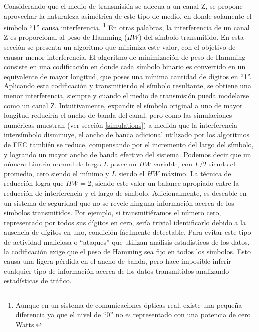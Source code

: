 Considerando que el medio de transmisión se adecua a un canal Z, se propone aprovechar la naturaleza asimétrica de este tipo de medio, en donde solamente el símbolo ``1'' causa interferencia. \footnote{Aunque en un sistema de comunicaciones ópticas real, existe una pequeña diferencia ya que el nivel de ``0'' no es representado con una potencia de cero Watts.}
En otras palabras, la interferencia de un canal Z es proporcional al peso de Hamming ($HW$) del símbolo transmitido.
En esta sección se presenta un algoritmo que minimiza este valor, con el objetivo de causar menor interferencia. El algoritmo de minimización de peso de Hamming consiste en una codificación en donde cada símbolo binario es convertido en un equivalente de mayor longitud, que posee una mínima cantidad de dígitos en ``1''. Aplicando esta codificación y transmitiendo el símbolo resultante, se obtiene una menor interferencia, siempre y cuando el medio de transmisión pueda modelarse como un canal Z.
Intuitivamente, expandir el símbolo original a uno de mayor longitud reduciría el ancho de banda del canal; pero como las simulaciones numéricas muestran (ver sección \ref{simulations}) a medida que la interferencia intersímbolo disminuye, el ancho de banda adicional utilizado por los algoritmos de FEC también se reduce, compensando por el incremento del largo del símbolo, y logrando un mayor ancho de banda efectivo del sistema.
Podemos decir que un número binario normal de largo $L$ posee un $HW$ variable, con $L/2$ siendo el promedio, cero siendo el mínimo y $L$ siendo el $HW$ máximo.
La técnica de reducción logra que $HW=2$, siendo este valor un balance apropiado entre la reducción de interferencia y el largo de símbolo.
Adicionalmente, es deseable en un sistema de seguridad que no se revele ninguna información acerca de los símbolos transmitidos. Por ejemplo, si transmitiéramos el número cero, representado por todos sus dígitos en cero, sería trivial identificarlo debido a la ausencia de dígitos en uno, condición fácilmente detectable. Para evitar este tipo de actividad maliciosa o ``ataques'' que utilizan análisis estadísticos de los datos, la codificación exige que el peso de Hamming sea fijo en todos los símbolos. Esto causa una ligera pérdida en el ancho de banda, pero hace imposible inferir cualquier tipo de información acerca de los datos transmitidos analizando estadísticas de tráfico.

